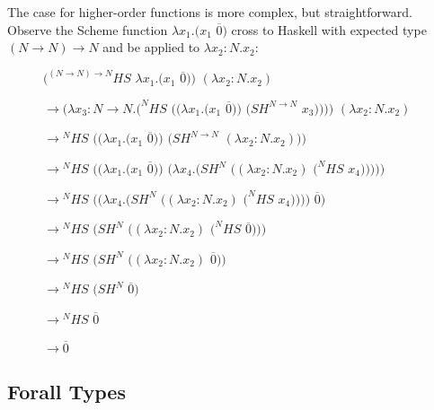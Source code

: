 The case for higher-order functions is more complex, but straightforward.  Observe the Scheme function $\lambda x_{1}.(x_{1}$ $\overline{0})$ cross to Haskell with expected type $(N\rightarrow N)\rightarrow N$ and be applied to $\lambda x_{2}:N.x_{2}$:

\begin{figure}[h]
$(^{(N\rightarrow N)\rightarrow N}HS$ $\lambda x_{1}.(x_{1}$ $\overline{0}))$ $(\lambda x_{2}:N.x_{2})$

\vspace{5pt}

$\rightarrow(\lambda x_{3}:N\rightarrow N.(^{N}HS$ $((\lambda x_{1}.(x_{1}$ $\overline{0}))$ $(SH^{N\rightarrow N}$ $x_{3}))))$ $(\lambda x_{2}:N.x_{2})$

\vspace{5pt}

$\rightarrow{^{N}H}S$ $((\lambda x_{1}.(x_{1}$ $\overline{0}))$ $(SH^{N\rightarrow N}$ $(\lambda x_{2}:N.x_{2})))$

\vspace{5pt}

$\rightarrow{^{N}H}S$ $((\lambda x_{1}.(x_{1}$ $\overline{0}))$ $(\lambda x_{4}.(SH^{N}$ $((\lambda x_{2}:N.x_{2})$ $(^{N}HS$ $x_{4})))))$

\vspace{5pt}

$\rightarrow{^{N}H}S$ $((\lambda x_{4}.(SH^{N}$ $((\lambda x_{2}:N.x_{2})$ $(^{N}HS$ $x_{4}))))$ $\overline{0})$

\vspace{5pt}

$\rightarrow{^{N}H}S$ $(SH^{N}$ $((\lambda x_{2}:N.x_{2})$ $(^{N}HS$ $\overline{0})))$

\vspace{5pt}

$\rightarrow{^{N}H}S$ $(SH^{N}$ $((\lambda x_{2}:N.x_{2})$ $\overline{0}))$

\vspace{5pt}

$\rightarrow{^{N}H}S$ $(SH^{N}$ $\overline{0})$

\vspace{5pt}

$\rightarrow{^{N}H}S$ $\overline{0}$

\vspace{5pt}

$\rightarrow\overline{0}$
\end{figure}

\subsection{Forall Types}

